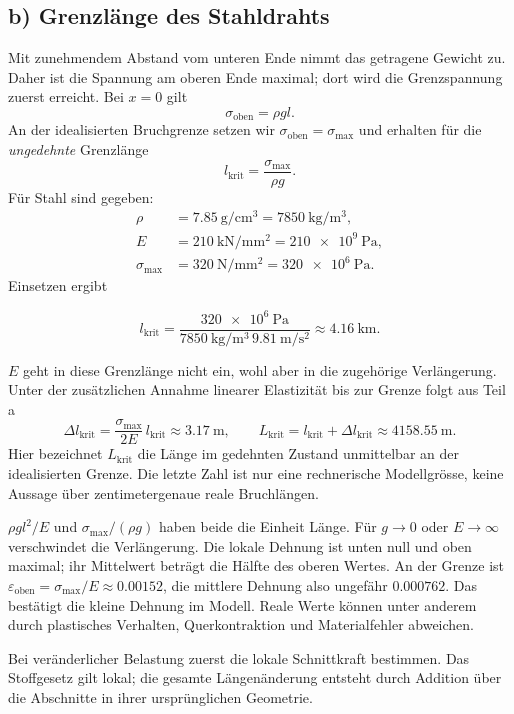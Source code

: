 \subsection*{b) Grenzlänge des Stahldrahts}
Mit zunehmendem Abstand vom unteren Ende nimmt das getragene Gewicht zu.
Daher ist die Spannung am oberen Ende maximal; dort wird die Grenzspannung
zuerst erreicht. Bei $x=0$ gilt
\begin{equation}
  \sigma_{\mathrm{oben}}=\rho g l.
\end{equation}
An der idealisierten Bruchgrenze setzen wir $\sigma_{\mathrm{oben}}=\sigma_{\max}$
und erhalten für die \emph{ungedehnte} Grenzlänge
\begin{equation}
  l_{\mathrm{krit}}=\frac{\sigma_{\max}}{\rho g}.
\end{equation}
Für Stahl sind gegeben:
\begin{align*}
  \rho&=\qty{7.85}{\gram\per\centi\metre\cubed}
       =\qty{7850}{\kilogram\per\metre\cubed},\\
  E&=\qty{210}{\kilo\newton\per\milli\metre\squared}
    =\qty{210e9}{\pascal},\\
  \sigma_{\max}&=\qty{320}{\newton\per\milli\metre\squared}
    =\qty{320e6}{\pascal}.
\end{align*}
Einsetzen ergibt
\begin{ergebnis}
\begin{equation*}
  l_{\mathrm{krit}}
  =\frac{\qty{320e6}{\pascal}}
         {\qty{7850}{\kilogram\per\metre\cubed}\,
          \qty{9.81}{\metre\per\second\squared}}
  \approx\qty{4.16}{\kilo\metre}.
\end{equation*}
\end{ergebnis}
$E$ geht in diese Grenzlänge nicht ein, wohl aber in die zugehörige
Verlängerung. Unter der zusätzlichen Annahme linearer Elastizität bis zur
Grenze folgt aus Teil a
\begin{equation}
  \Delta l_{\mathrm{krit}}
  =\frac{\sigma_{\max}}{2E}\,l_{\mathrm{krit}}
  \approx\qty{3.17}{\metre}, \qquad
  L_{\mathrm{krit}}=l_{\mathrm{krit}}+\Delta l_{\mathrm{krit}}
  \approx\qty{4158.55}{\metre}.
\end{equation}
Hier bezeichnet $L_{\mathrm{krit}}$ die Länge im gedehnten Zustand unmittelbar
an der idealisierten Grenze. Die letzte Zahl ist nur eine rechnerische
Modellgrösse, keine Aussage über zentimetergenaue reale Bruchlängen.

\begin{kontrolle}
$\rho g l^2/E$ und $\sigma_{\max}/(\rho g)$ haben beide die Einheit Länge.
Für $g\to0$ oder $E\to\infty$ verschwindet die Verlängerung. Die lokale
Dehnung ist unten null und oben maximal; ihr Mittelwert beträgt die Hälfte
des oberen Wertes. An der Grenze ist
$\varepsilon_{\mathrm{oben}}=\sigma_{\max}/E\approx\num{0.00152}$,
die mittlere Dehnung also ungefähr $\num{0.000762}$. Das bestätigt die
kleine Dehnung im Modell. Reale Werte können unter anderem durch plastisches
Verhalten, Querkontraktion und Materialfehler abweichen.
\end{kontrolle}

\begin{merksatz}
Bei veränderlicher Belastung zuerst die lokale Schnittkraft bestimmen. Das
Stoffgesetz gilt lokal; die gesamte Längenänderung entsteht durch Addition
über die Abschnitte in ihrer ursprünglichen Geometrie.
\end{merksatz}
